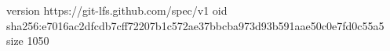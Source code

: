version https://git-lfs.github.com/spec/v1
oid sha256:e7016ac2dfcdb7cff72207b1c572ae37bbcba973d93b591aae50c0e7fd0c55a5
size 1050
